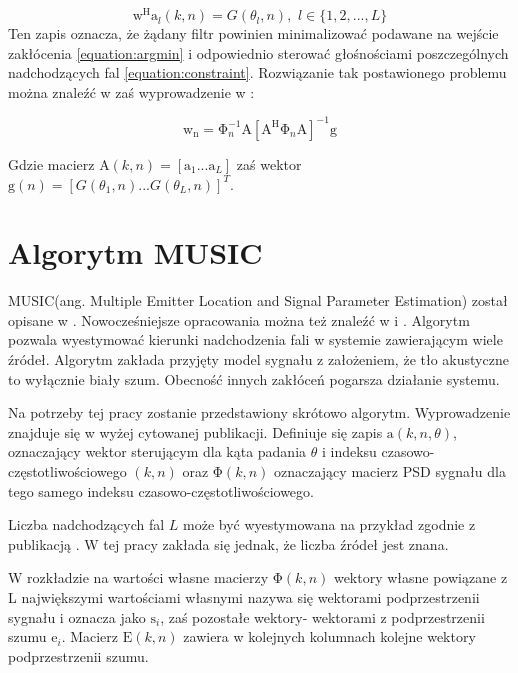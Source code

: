 \begin{equation}
    \label{equation:constraint}
    \bm{\mathrm{w}}^{\mathrm{H}}
    \bm{\mathrm{a}}_{l}(k,n)=
    G(\theta_{l},n),
    \, \, l \in \{1,2,...,L\}
\end{equation}
Ten zapis oznacza, że żądany filtr powinien minimalizować podawane na wejście zakłócenia \ref{equation:argmin} i odpowiednio sterować głośnościami poszczególnych nadchodzących fal \ref{equation:constraint}. Rozwiązanie tak postawionego problemu można znaleźć w \cite{Thiergart2013} zaś wyprowadzenie w \cite{Frost1972}:

\begin{equation}
    \label{equation:lcmv formula}
    \bm{\mathrm{w}}_{\mathrm{n}}=
    \bm{\mathrm{\Phi}}_{n}^{-1}\bm{\mathrm{A}}
    [\bm{\mathrm{A}}^{\mathrm{H}} \bm{\mathrm{\Phi}}_{n} \bm{\mathrm{A}}]^{-1}
    \bm{\mathrm{g}}
\end{equation}

\noindent Gdzie macierz $\bm{\mathrm{A}}(k,n)=
[\bm{\mathrm{a}}_{1}...\bm{\mathrm{a}}_{L}]$ zaś wektor $\bm{\mathrm{g}}(n)=[G(\theta_{1},n)...G(\theta_{L},n)]^{T}$.

\section{Algorytm MUSIC}

MUSIC(ang. Multiple Emitter Location and Signal Parameter Estimation) został opisane w \cite{Schmidt1986}. Nowocześniejsze opracowania można też znaleźć w \cite{DOA} i \cite{Benesty2008}. Algorytm pozwala wyestymować kierunki nadchodzenia fali w systemie zawierającym wiele źródeł. Algorytm zakłada przyjęty model sygnału z założeniem, że tło akustyczne to wyłącznie biały szum. Obecność innych zakłóceń pogarsza działanie systemu.

\noindent Na potrzeby tej pracy zostanie przedstawiony skrótowo algorytm. Wyprowadzenie znajduje się w wyżej cytowanej publikacji. 
Definiuje się zapis $\bm{\mathrm{a}}(k,n,\theta)$, oznaczający wektor sterującym dla kąta padania $\theta$ i indeksu czasowo-częstotliwościowego $(k,n)$ oraz $\bm{\mathrm{\Phi}}(k,n)$ oznaczający macierz PSD sygnału dla tego samego indeksu czasowo-częstotliwościowego.

\noindent Liczba nadchodzących fal $L$ może być wyestymowana na przykład zgodnie z publikacją \cite{n_src}. W tej pracy zakłada się jednak, że liczba źródeł jest znana.

\noindent W rozkładzie na wartości własne macierzy $\bm{\mathrm{\Phi}}(k,n)$ wektory własne powiązane z L największymi wartościami własnymi nazywa się wektorami podprzestrzenii sygnału i oznacza jako $\bm{\mathrm{s}}_{i}$, zaś pozostałe wektory- wektorami z podprzestrzenii szumu $\bm{\mathrm{e}}_{i}$. Macierz $\bm{\mathrm{E}}(k,n)$ zawiera w kolejnych kolumnach kolejne wektory podprzestrzenii szumu.

